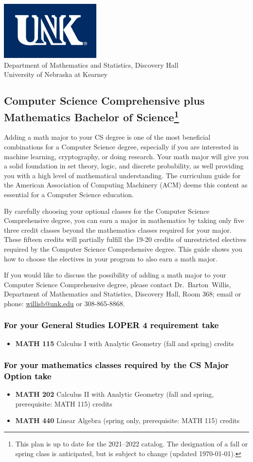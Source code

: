 \documentclass[10pt]{article}
\makeatletter
\newcommand{\calcone}{\textbf{MATH 115} Calculus I with Analytic Geometry (fall and spring) \dotfill 5 credits}
\newcommand{\calctwo}{\textbf{MATH 202} Calculus II with Analytic Geometry (fall and spring, prerequisite: MATH 115) \dotfill 5 credits }
\newcommand{\linear}{\textbf{MATH 440} Linear Algebra (spring only, prerequisite: MATH 115) \dotfill 3 credits}
\newcommand{\contactbw}{\mbox{Dr.\ Barton Willis}, Department of Mathematics and Statistics,  Discovery Hall, Room 368;
email or phone: \href{mailto:willisb@unk.edu}{willisb@unk.edu} or 308-865-8868.}
\newcommand{\forinfo}[2]{If you would like to discuss the possibility of adding a math {#1} to your {#2}, please contact \contactbw}
\newcommand{\catalog}{2021--2022 }
\newcommand{\myfootnote}{\footnote{This plan is up to date for  the \catalog catalog. The designation of a fall or spring class is 
anticipated, but  is subject to change (updated  \today).}}
\newcommand{\myheading}{
\begin{flushleft}
\includegraphics[scale=0.35]{unk-logo}\\
\setcounter{footnote}{0}
\vspace{0.25in}
 \textcolor{unkblue}{Department of Mathematics and Statistics, Discovery Hall} \\
  \textcolor{unkblue}{University of Nebraska at Kearney}
\end{flushleft}}
\makeatother
\begin{document}
\myheading



\vspace{-0.1in}
\subsection*{\textbf{\textcolor{unkblue}{Computer Science Comprehensive plus Mathematics Bachelor of Science\myfootnote}}}

Adding a math major to your CS degree is one of the most beneficial combinations for a Computer Science degree, especially if you are interested in machine learning, cryptography,   or doing research.  Your math major  will give you a solid foundation in set theory, logic, and discrete probability, as well providing you with a high level of mathematical understanding.  The curriculum guide for the American Association of Computing Machinery (ACM) deems  this content  as essential for  a Computer Science education.

By carefully choosing your optional classes for the Computer Science Comprehensive degree, you can earn a major in mathematics by taking only five three credit classes beyond the mathematics classes required for your major.  These fifteen credits will partially fulfill the 19-20 credits of unrestricted electives required by the Computer Science Comprehensive degree. This guide shows you how to choose the electives in your program to also earn a math major.


\forinfo{major}{Computer Science Comprehensive degree}


\subsubsection*{\textcolor{black}{For  your General Studies LOPER 4 requirement take}}
\begin{itemize}
\item \calcone
\end{itemize}


\subsubsection*{\textcolor{black}{For your mathematics classes required by the CS Major Option take}}
\begin{itemize}
\item \calctwo
\item \linear
\end{itemize}
\end{document}
